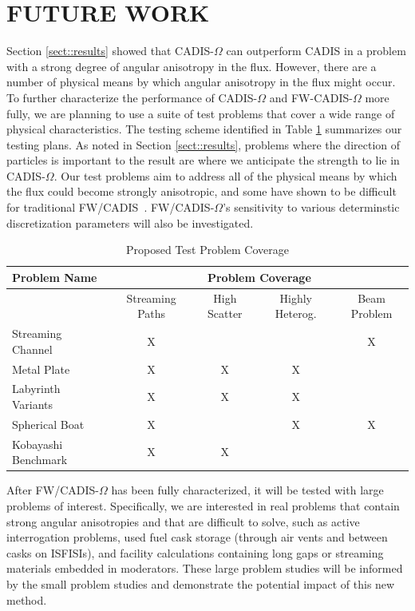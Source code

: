 \documentclass[12pt]{article}
\begin{document}
%
\section{FUTURE WORK} 
\label{sect::future}
 
Section \ref{sect::results} showed that CADIS-$\Omega$ can outperform CADIS in a problem with a strong degree of angular anisotropy in the flux. However, there are a number of physical means by which angular anisotropy in the flux might occur. To further characterize the performance of CADIS-$\Omega$ and FW-CADIS-$\Omega$ more fully, we are planning to use a suite of test problems that cover a wide range of physical characteristics. The testing scheme identified in Table \ref{tab:testprobs} summarizes our testing plans. As noted in Section \ref{sect::results}, problems where the direction of particles is important to the result are where we anticipate the strength to lie in CADIS-$\Omega$. Our test problems aim to address all of the physical means by which the flux could become strongly anisotropic, and some have shown to be difficult for traditional FW/CADIS~\cite{peplow_consistent_2012}. FW/CADIS-$\Omega$'s sensitivity to various determinstic discretization parameters will also be investigated. 

 \begin{table}
  \centering
  \caption{Proposed Test Problem Coverage}
  \begin{tabular}{l|cccc}
    \toprule
    Problem Name & \multicolumn{4}{c}{Problem Coverage} \\
    \hline
     & Streaming Paths & High Scatter & Highly Heterog. & Beam Problem \\
    \hline
    Streaming Channel   & X & & & X \\ 
    Metal Plate         & X & X & X &  \\
    Labyrinth Variants  & X & X & X &  \\ 
    Spherical Boat      & X & & X & X \\  
    Kobayashi Benchmark & X & X &  &  \\   
	\bottomrule
  \end{tabular}
  \label{tab:testprobs}
\end{table}

After FW/CADIS-$\Omega$ has been fully characterized, it will be tested with large problems of interest. 
Specifically, we are interested in real problems that contain strong angular anisotropies and that are difficult to solve, such as active interrogation problems, used fuel cask storage (through air vents and between casks on ISFISIs), and facility calculations containing long gaps or streaming materials embedded in moderators. 
These large problem studies will be informed by the small problem studies and demonstrate the potential impact of this new method. 
\end{document}
